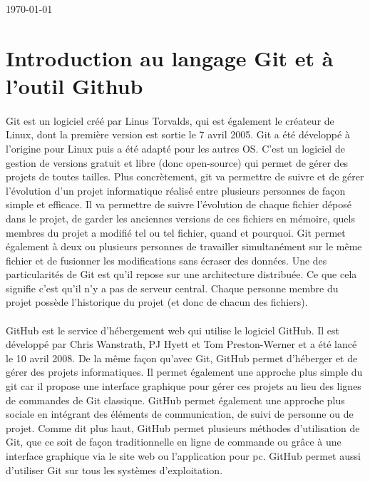 \documentclass[11pt,canadien]{article}
\begin{document}
\begin{titlepage}

{\large \today}\\[2cm]

\vfill %

\end{titlepage}

\newpage
\tableofcontents

\section{Introduction au langage Git et à l'outil Github}

\paragraph{} Git est un logiciel créé par Linus Torvalds, qui est également le créateur de Linux, dont la première version est sortie le 7 avril 2005. Git a été développé à l'origine pour Linux puis a été adapté pour les autres OS. C'est un logiciel de gestion de versions gratuit et libre (donc open-source) qui permet de gérer des projets de toutes tailles. Plus concrètement, git va permettre de suivre et de gérer l'évolution d'un projet informatique réalisé entre plusieurs personnes de façon simple et efficace. Il va permettre de suivre l'évolution de chaque fichier déposé dans le projet, de garder les anciennes versions de ces fichiers en mémoire, quels membres du projet a modifié tel ou tel fichier, quand et pourquoi. Git permet également à deux ou plusieurs personnes de travailler simultanément sur le même fichier et de fusionner les modifications sans écraser des données. Une des particularités de Git est qu'il repose sur une architecture distribuée. Ce que cela signifie c'est qu'il n'y a pas de serveur central. Chaque personne membre du projet possède l'historique du projet (et donc de chacun des fichiers).

\paragraph{} GitHub est le service d'hébergement web qui utilise le logiciel GitHub. Il est développé par Chris Wanstrath, PJ Hyett et Tom Preston-Werner et a été lancé le 10 avril 2008. De la même façon qu'avec Git, GitHub permet d'héberger et de gérer des projets informatiques. Il permet également une approche plus simple du git car il propose une interface graphique pour gérer ces projets au lieu des lignes de commandes de Git classique. GitHub permet également une approche plus sociale en intégrant des éléments de communication, de suivi de personne ou de projet. Comme dit plus haut, GitHub permet plusieurs méthodes d'utilisation de Git, que ce soit de façon traditionnelle en ligne de commande ou grâce à une interface graphique via le site web ou l'application pour pc. GitHub permet aussi d'utiliser Git sur tous les systèmes d'exploitation.
\end{document}
